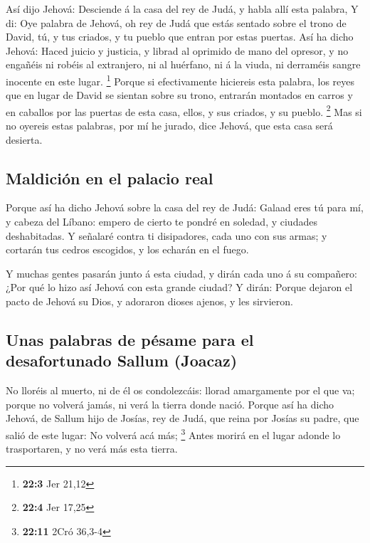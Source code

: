  Así dijo Jehová: Desciende á la casa del rey de Judá, y
habla allí esta palabra,  Y di: Oye palabra de Jehová, oh
rey de Judá que estás sentado sobre el trono de David, tú, y tus
criados, y tu pueblo que entran por estas puertas.  Así ha
dicho Jehová: Haced juicio y justicia, y librad al oprimido de mano del
opresor, y no engañéis ni robéis al extranjero, ni al huérfano, ni á la
viuda, ni derraméis sangre inocente en este lugar. \footnote{\textbf{22:3}
  Jer 21,12}  Porque si efectivamente hiciereis esta
palabra, los reyes que en lugar de David se sientan sobre su trono,
entrarán montados en carros y en caballos por las puertas de esta casa,
ellos, y sus criados, y su pueblo. \footnote{\textbf{22:4} Jer 17,25}
 Mas si no oyereis estas palabras, por mí he jurado, dice
Jehová, que esta casa será desierta.

\hypertarget{maldiciuxf3n-en-el-palacio-real}{%
\subsection{Maldición en el palacio
real}\label{maldiciuxf3n-en-el-palacio-real}}

 Porque así ha dicho Jehová sobre la casa del rey de Judá:
Galaad eres tú para mí, y cabeza del Líbano: empero de cierto te pondré
en soledad, y ciudades deshabitadas.  Y señalaré contra ti
disipadores, cada uno con sus armas; y cortarán tus cedros escogidos, y
los echarán en el fuego.

 Y muchas gentes pasarán junto á esta ciudad, y dirán cada
uno á su compañero: ¿Por qué lo hizo así Jehová con esta grande ciudad?
 Y dirán: Porque dejaron el pacto de Jehová su Dios, y
adoraron dioses ajenos, y les sirvieron.

\hypertarget{unas-palabras-de-puxe9same-para-el-desafortunado-sallum-joacaz}{%
\subsection{Unas palabras de pésame para el desafortunado Sallum
(Joacaz)}\label{unas-palabras-de-puxe9same-para-el-desafortunado-sallum-joacaz}}

 No lloréis al muerto, ni de él os condolezcáis: llorad
amargamente por el que va; porque no volverá jamás, ni verá la tierra
donde nació.  Porque así ha dicho Jehová, de Sallum hijo
de Josías, rey de Judá, que reina por Josías su padre, que salió de este
lugar: No volverá acá más; \footnote{\textbf{22:11} 2Cró 36,3-4}
 Antes morirá en el lugar adonde lo trasportaren, y no
verá más esta tierra.

